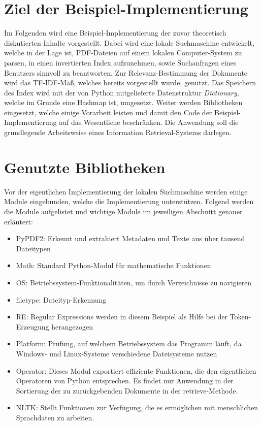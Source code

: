\section{Ziel der Beispiel-Implementierung}\label{ziel-der-beispiel-implementierung}

Im Folgenden wird eine Beispiel-Implementierung der zuvor theoretisch diskutierten Inhalte vorgestellt. Dabei wird eine lokale Suchmaschine entwickelt, welche in der Lage ist, PDF-Dateien auf einem lokalen Computer-System zu parsen, in einen invertierten Index aufzunehmen, sowie Suchanfragen eines Benutzers sinnvoll zu beantworten. Zur Relevanz-Bestimmung der Dokumente wird das TF-IDF-Maß, welches bereits vorgestellt wurde, genutzt. Das Speichern des Index wird mit der von Python mitgelieferte Datenstruktur \textit{Dictionary}, welche im Grunde eine Hashmap ist, umgesetzt. Weiter werden Bibliotheken eingesetzt, welche einige Vorarbeit leisten und damit den Code der Beispiel-Implementierung auf das Wesentliche beschränken. Die Anwendung soll die grundlegende Arbeitsweise eines Information Retrieval-Systems darlegen.

\section{Genutzte Bibliotheken}\label{genutzte-bibliotheken}

Vor der eigentlichen Implementierung der lokalen Suchmaschine werden einige Module eingebunden, welche die Implementierung unterstützen. Folgend werden die Module aufgelistet und wichtige Module im jeweiligen Abschnitt genauer erläutert:\newpage
\begin{itemize}
	\item PyPDF2: Erkennt und extrahiert Metadaten und Texte aus über tausend Dateitypen
	\item Math: Standard Python-Modul für mathematische Funktionen
	\item OS: Betriebssystem-Funktionalitäten, um durch Verzeichnisse zu navigieren
	\item filetype: Dateityp-Erkennung
	\item RE: Regular Expressions werden in diesem Beispiel als Hilfe bei der Token-Erzeugung herangezogen
	\item Platform: Prüfung, auf welchem Betriebssystem das Programm läuft, da Windows- und Linux-Systeme verschiedene Dateisysteme nutzen
	\item Operator: Dieses Modul exportiert effiziente Funktionen, die den eigentlichen Operatoren von Python entsprechen. Es findet nur Anwendung in der Sortierung der zu zurückgebenden Dokumente in der retrieve-Methode.
	\item NLTK: Stellt Funktionen zur Verfügung, die es ermöglichen mit menschlichen Sprachdaten zu arbeiten.
\end{itemize}

